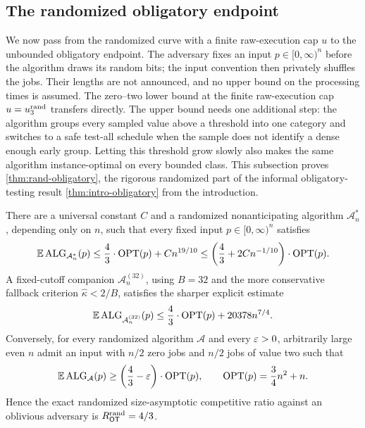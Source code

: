 \subsection{The randomized obligatory endpoint}
\label{sec:random-obligatory}

We now pass from the randomized curve with a finite raw-execution cap $u$ to
the unbounded obligatory endpoint.  The adversary fixes an input
$p\in[0,\infty)^n$ before the algorithm
draws its random bits; the input convention then privately shuffles the
jobs.  Their lengths are not announced, and no upper bound on
the processing times is assumed.  The zero--two lower bound at the finite
raw-execution cap $u=u_{3}^{\mathrm{rand}}$
transfers directly.  The upper bound needs one additional step: the
algorithm groups every sampled value above a threshold into one category and
switches to a safe test-all schedule when the sample does not identify a
dense enough early group.  Letting this threshold grow slowly
also makes the same algorithm instance-optimal on every bounded class.  This
subsection proves
\cref{thm:rand-obligatory},
the rigorous randomized part of the informal obligatory-testing result
\cref{thm:intro-obligatory} from the introduction.

\begin{theorem}
\label{thm:rand-obligatory}
There are a universal constant $C$ and a randomized nonanticipating
algorithm $\mathcal A_n^*$, depending only on $n$, such that every fixed
input $p\in[0,\infty)^n$ satisfies
\begin{equation}
 \mathbb{E}\operatorname{ALG}_{\mathcal A_n^*}(p)
 \le \frac43\cdot\operatorname{OPT}(p)+Cn^{19/10}
 \le\left(\frac43+2Cn^{-1/10}\right)\cdot\operatorname{OPT}(p).
 \label{eq:rand-obligatory-upper}
\end{equation}
A fixed-cutoff companion $\mathcal A_n^{(32)}$, using $B=32$ and the more
conservative fallback criterion $\widehat\kappa<2/B$, satisfies the sharper
explicit estimate
\begin{equation}
 \mathbb{E}\operatorname{ALG}_{\mathcal A_n^{(32)}}(p)
 \le \frac43\cdot\operatorname{OPT}(p)+20378n^{7/4}.
 \label{eq:rand-obligatory-fixed-upper}
\end{equation}
Conversely, for every randomized algorithm $\mathcal A$ and every $\varepsilon>0$,
arbitrarily large even $n$ admit an input with $n/2$ zero jobs and
$n/2$ jobs of value two such that
\begin{equation}
 \mathbb{E}\operatorname{ALG}_{\mathcal A}(p)
 \ge\left(\frac43-\varepsilon\right)\cdot\operatorname{OPT}(p),
 \qquad
 \operatorname{OPT}(p)=\frac34n^2+n.
 \label{eq:rand-obligatory-lower}
\end{equation}
Hence the exact randomized size-asymptotic competitive ratio against an
oblivious adversary is $R_{\mathsf{OT}}^{\mathrm{rand}}=4/3$.
\end{theorem}

